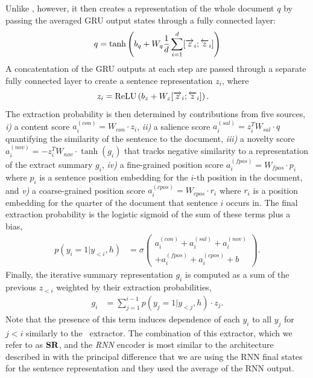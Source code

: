 Unlike \modelOneBF, however, it then creates a representation
of the whole document $q$ by passing the averaged GRU output states through
a fully connected layer: 
\begin{align}
q = \tanh\left(b_q + W_q\frac{1}{d}\sum_{i=1}^{d} [\overrightarrow{z}_i; \overleftarrow{z}_i] \right)
\end{align}
A concatentation of the GRU outputs at each step
are passed through a separate fully connected layer to create a 
sentence representation $z_i$, where
\begin{align}
    z_i &= \operatorname{ReLU}\left(b_z + W_z [\overrightarrow{z}_i; \overleftarrow{z}_i]\right).
\end{align}
The extraction probability is then determined by contributions from five 
sources,
\textit{i)} a content score $a^{(con)}_i=W_{con}\cdot z_i$, 
\textit{ii)} a salience score $a^{(sal)}_i = z_i^TW_{sal} \cdot q$ quantifying the 
similarity of the sentence to the document, 
\textit{iii)} a novelty score $a^{(nov)}_i = -z_i^TW_{nov} \cdot \tanh(g_i)$
that tracks negative similarity to a representation of the extract summary 
$g_i$,
\textit{iv)} a fine-grained position score 
$a^{(fpos)}_i = W_{fpos}\cdot p_i$ where
$p_i$ is a sentence position embedding for the $i$-th position in the document,
and \textit{v)} a coarse-grained position score 
$a^{(cpos)}_i = W_{cpos}\cdot r_i$ where
$r_i$ is a position embedding for the quarter of the document
that sentence $i$ occurs in.
The final extraction probability is the logistic sigmoid of the
sum of these terms plus a bias,
\begin{align}
    p(y_i=1|y_{<i}, h) &= \sigma\left(\begin{array}{l}
      a_i^{(con)} + a_i^{(sal)} + a_i^{(nov)} \\
  + a_i^{(fpos)}  + a_i^{(cpos)} + b \end{array}\right).
\end{align}
Finally, the iterative summary representation $g_i$ is computed as a 
sum of the previous $z_{<i}$ weighted by their extraction probabilities,
\begin{align}
g_i & = \sum_{j=1}^{i-1} p(y_j=1|y_{<j},h) \cdot z_j.
\end{align}
Note that the presence of this term induces dependence of each $y_i$ to 
all $y_{j}$ for $j < i$ similarly to the \baselineOneBF~extractor.
The combination of this extractor, which we refer to as $\textbf{SR}$,
and the \textit{RNN} encoder is most similar to the architecture described 
in \cite{nallapati} with the principal difference that we are using the RNN
final states for the sentence representation and they used the average of
the RNN output.

